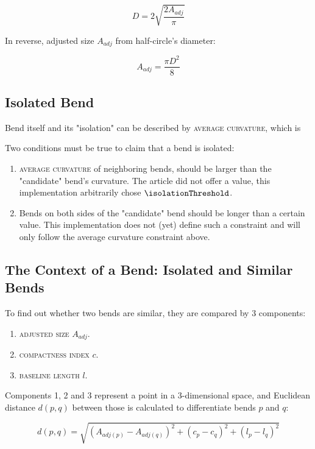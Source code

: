\documentclass[a4paper]{article}
\begin{document}
\[
  D = 2\sqrt{\frac{2 A_{adj}}{\pi}}
\]

In reverse, adjusted size $A_{adj}$ from half-circle's diameter:

\[
  A_{adj} = \frac{\pi D^2}{8}
\]

\subsection{Isolated Bend}

Bend itself and its "isolation" can be described by \textsc{average curvature},
which is 

Two conditions must be true to claim that a bend is isolated:

\begin{enumerate}
    \item \textsc{average curvature} of neighboring bends, should be larger
        than the "candidate" bend's curvature. The article did not offer a
        value, this implementation arbitrarily chose $\isolationThreshold$.

    \item Bends on both sides of the "candidate" bend should be longer than a
        certain value. This implementation does not (yet) define such a
        constraint and will only follow the average curvature constraint above.

\end{enumerate}

\subsection{The Context of a Bend: Isolated and Similar Bends}

To find out whether two bends are similar, they are compared by 3 components:

\begin{enumerate}
  \item \textsc{adjusted size} $A_{adj}$.
  \item \textsc{compactness index} $c$.
  \item \textsc{baseline length} $l$.
\end{enumerate}

Components 1, 2 and 3 represent a point in a 3-dimensional space, and Euclidean
distance $d(p,q)$ between those is calculated to differentiate bends $p$ and
$q$:

\[
  d(p,q) = \sqrt{(A_{adj(p)}-A_{adj(q)})^2 +
                   (c_p-c_q)^2 +
                   (l_p-l_q)^2}
\]
\end{document}
